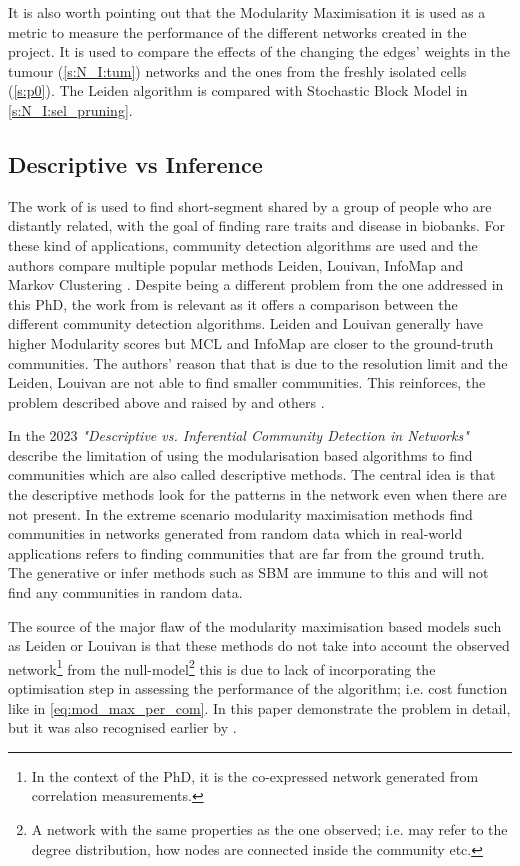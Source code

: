 It is also worth pointing out that the Modularity Maximisation it is used as a metric to measure the performance of the different networks created in the project. It is used to compare the effects of the changing the edges' weights in the tumour (\cref{s:N_I:tum}) networks and the ones from the freshly isolated cells (\cref{s:p0}). The Leiden algorithm is compared with Stochastic Block Model in \cref{s:N_I:sel_pruning}.


\subsection{Descriptive vs Inference} \label{s:lit:descriptive_inference}

The work of \citet{Shemirani2023-ww} is used to find short-segment shared by a group of people who are distantly related, with the goal of finding rare traits and disease in biobanks. For these kind of applications, community detection algorithms are used and the authors compare multiple popular methods Leiden, Louivan, InfoMap \citep{Rosvall2008-kw} and Markov Clustering \citep{Van_Dongen2008-yj}. Despite being a different problem from the one addressed in this PhD, the work from \citet{Shemirani2023-ww} is relevant as it offers a comparison between the different community detection algorithms. Leiden and Louivan generally have higher Modularity scores but MCL and InfoMap are closer to the ground-truth communities. The authors' reason that that is due to the resolution limit and the Leiden, Louivan are not able to find smaller communities. This reinforces, the problem described above and raised by \citep{Peixoto2023-se} and others \citep{Fortunato2007-gh, Traag2019-ne}.

In the 2023 \textit{"Descriptive vs. Inferential Community Detection in Networks"} \citep{Peixoto2023-se} describe the limitation of using the modularisation based algorithms to find communities which are also called descriptive methods. The central idea is that the descriptive methods look for the patterns in the network even when there are not present. In the extreme scenario modularity maximisation methods find communities in networks generated from random data which in real-world applications refers to finding communities that are far from the ground truth. The generative or infer methods such as SBM are immune to this and will not find any communities in random data.

The source of the major flaw of the modularity maximisation based models such as Leiden or Louivan is that these methods do not take into account the observed network\footnote{In the context of the PhD, it is the co-expressed network generated from correlation measurements.} from the null-model\footnote{A network with the same properties as the one observed; i.e. may refer to the degree distribution, how nodes are connected inside the community etc.} this is due to lack of incorporating the optimisation step in assessing the performance of the algorithm; i.e. cost function like in \cref{eq:mod_max_per_com}. In this paper \citet{Peixoto2023-se} demonstrate the problem in detail, but it was also recognised earlier by \citet{Guimera2004-gv}.

